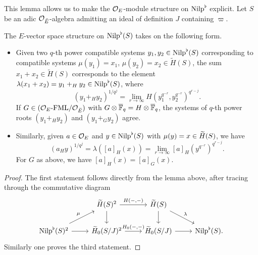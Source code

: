 \documentclass[../main.tex]{subfiles}
\begin{document}
This lemma allows us to make the $\cO_E$-module structure on $\Nilp^\flat$
explicit. Let $S$ be an adic $\cO_\br E$-algebra admitting an ideal of definition $J$ 
containing $\varpi$. 

\begin{lem}\label{lem:GroupStructureOnNilp}
  The $E$-vector space structure on $\Nilp^\flat(S)$ takes on the following form.
  \begin{itemize}
    \item Given two $q$-th power compatible systems $y_1, y_2
      \in \Nilp^\flat(S)$ corresponding to compatible systems
      $\mu(y_1) = x_1$, $\mu(y_2) = x_2 \in \tilde H(S)$, the sum $x_1 + x_2 \in
      \tilde H(S)$ corresponds to the element $\lambda(x_1 + x_2) = y_1 +_H y_2 \in
      \Nilp^\flat(S)$, where 
      \begin{equation*}
        (y_1 +_H y_2)^{1/q^j} = \lim_{r \to \infty} H( y_1^{q^{-r}},
        y_2^{q^{-r}})^{q^{r-j}}.
      \end{equation*}
      If $G \in \FMLOver {\cO_E}{\cO_\br E}$ with $G \otimes \Fqbar = H \otimes \Fqbar$,
      the systems of $q$-th power roots $(y_1 +_H y_2)$ and $(y_1 +_G y_2)$ agree. 
    \item Similarly, given $a \in \cO_E$ and $y \in \Nilp^\flat(S)$ with
      $\mu(y) = x \in \Tilde H(S)$, we have 
      \begin{equation*}
        (a_H y)^{1/q^j} = \lambda([a]_H(x)) = \lim_{r \to \infty}
        [a]_H(y^{q^{-r}})^{q^{r-j}}.
      \end{equation*}
      For $G$ as above, we have $[a]_H(x) = [a]_G(x)$. 
  \end{itemize}
\begin{proof}
  The first statement follows directly from the lemma above, after tracing
  through the commutative diagram
  \begin{equation*}
    \begin{tikzcd}[ampersand replacement=\&]
    	\& {\Tilde H(S)^2} \& {\Tilde H(S)} \\
    	{\Nilp^\flat(S)^2} \& {\Tilde H_0(S/J)^2} \& {\Tilde H_0(S/J)} \& {\Nilp^\flat(S).}
    	\arrow["{H(-,-)}", from=1-2, to=1-3]
    	\arrow[ from=1-2, to=2-2]
    	\arrow[ from=1-3, to=2-3]
    	\arrow["\lambda", from=1-3, to=2-4]
    	\arrow["\mu", from=2-1, to=1-2]
    	\arrow[ from=2-1, to=2-2]
    	\arrow["{H_0(-,-)}", from=2-2, to=2-3]
    	\arrow[from=2-3, to=2-4]
    \end{tikzcd}
  \end{equation*}
  Similarly one proves the third statement.
\end{proof}
\end{lem}
\end{document}
